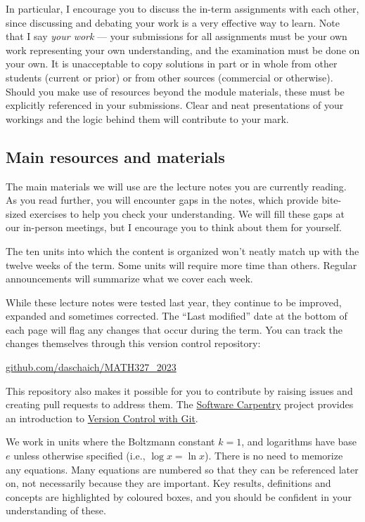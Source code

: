 In particular, I encourage you to discuss the in-term assignments with each other, since discussing and debating your work is a very effective way to learn.
Note that I say \textit{your work} --- your submissions for all assignments must be your own work representing your own understanding, and the examination must be done on your own.
It is unacceptable to copy solutions in part or in whole from other students (current or prior) or from other sources (commercial or otherwise).
Should you make use of resources beyond the module materials, these must be explicitly referenced in your submissions.
Clear and neat presentations of your workings and the logic behind them will contribute to your mark.



\subsection*{Main resources and materials}
The main materials we will use are the lecture notes you are currently reading.
As you read further, you will encounter gaps in the notes, which provide bite-sized exercises to help you check your understanding.
We will fill these gaps at our in-person meetings, but I encourage you to think about them for yourself.

The ten units into which the content is organized won't neatly match up with the twelve weeks of the term.
Some units will require more time than others.
Regular announcements will summarize what we cover each week.

While these lecture notes were tested last year, they continue to be improved, expanded and sometimes corrected.
The ``Last modified'' date at the bottom of each page will flag any changes that occur during the term.
You can track the changes themselves through this version control repository: \\
\centerline{\href{https://github.com/daschaich/MATH327_2023}{github.com/daschaich/MATH327\_2023}}
This repository also makes it possible for you to contribute by raising issues and creating pull requests to address them.
The \href{https://software-carpentry.org}{Software Carpentry} project provides an introduction to \href{https://swcarpentry.github.io/git-novice/}{Version Control with Git}.

We work in units where the Boltzmann constant $k = 1$, and logarithms have base $e$ unless otherwise specified (i.e., $\log x = \ln x$).
There is no need to memorize any equations.
Many equations are numbered so that they can be referenced later on, not necessarily because they are important.
Key results, definitions and concepts are highlighted by coloured boxes, and you should be confident in your understanding of these.

